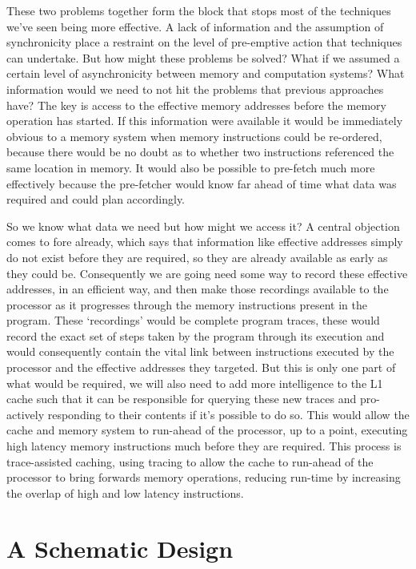 These two problems together form the block that stops most of the techniques we've seen being more effective. A lack of information and the assumption of synchronicity place a restraint on the level of pre-emptive action that techniques can undertake. But how might these problems be solved? What if we assumed a certain level of asynchronicity between memory and computation systems? What information would we need to not hit the problems that previous approaches have? The key is access to the effective memory addresses before the memory operation has started. If this information were available it would be immediately obvious to a memory system when memory instructions could be re-ordered, because there would be no doubt as to whether two instructions referenced the same location in memory. It would also be possible to pre-fetch much more effectively because the pre-fetcher would know far ahead of time what data was required and could plan accordingly. 

So we know what data we need but how might we access it? A central objection comes to fore already, which says that information like effective addresses simply do not exist before they are required, so they are already available as early as they could be. Consequently we are going need some way to record these effective addresses, in an efficient way, and then make those recordings available to the processor as it progresses through the memory instructions present in the program. These `recordings' would be complete program traces, these would record the exact set of steps taken by the program through its execution and would consequently contain the vital link between instructions executed by the processor and the effective addresses they targeted. But this is only one part of what would be required, we will also need to add more intelligence to the L1 cache such that it can be responsible for querying these new traces and pro-actively responding to their contents if it's possible to do so. This would allow the cache and memory system to run-ahead of the processor, up to a point, executing high latency memory instructions much before they are required. This process is trace-assisted caching, using tracing to allow the cache to run-ahead of the processor to bring forwards memory operations, reducing run-time by increasing the overlap of high and low latency instructions.

\section{A Schematic Design}


